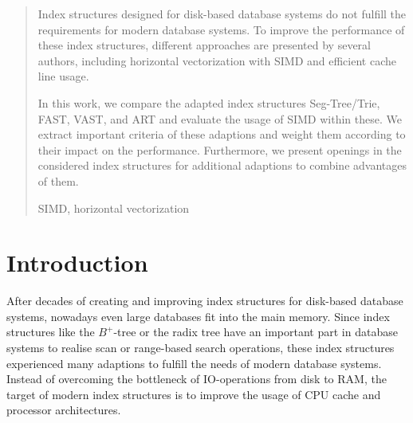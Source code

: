 \documentclass[runningheads,a4paper]{llncs}
\newcommand{\keywords}[1]{\par\addvspace\baselineskip
\noindent\keywordname\enspace\ignorespaces#1}
\begin{document}
\begin{abstract}
	Index structures designed for disk-based database systems do not fulfill the requirements for modern database systems. To improve the performance of these index structures, different approaches are presented by several authors, including horizontal vectorization with SIMD and efficient cache line usage. 
	
	In this work, we compare the adapted index structures Seg-Tree/Trie, FAST, VAST, and ART and evaluate the usage of SIMD within these. We extract important criteria of these adaptions and weight them according to their impact on the performance. Furthermore, we present openings in the considered index structures for additional adaptions to combine advantages of them.
	
	\keywords SIMD, horizontal vectorization
\end{abstract}

	

\section{Introduction}
After decades of creating and improving index structures for disk-based database systems, nowadays even large databases fit into the main memory. Since index structures like the $B^+$-tree or the radix tree have an important part in database systems to realise scan or range-based search operations, these index structures experienced many adaptions to fulfill the needs of modern database systems. Instead of overcoming the bottleneck of IO-operations from disk to RAM, the target of modern index structures is to improve the usage of CPU cache and processor architectures.
\end{document}
